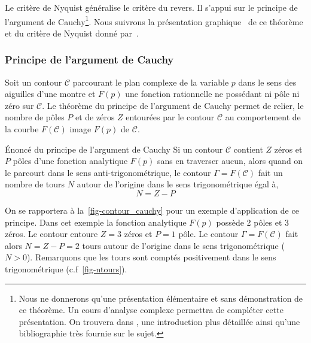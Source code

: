 Le critère de Nyquist généralise le critère du revers.
Il s'appui sur le principe de l'argument de Cauchy\footnote{Nous ne donnerons qu'une 
présentation élémentaire et sans démonstration
de ce théorème. Un cours d'analyse complexe permettra de compléter cette présentation. On 
trouvera dans \cite{laas_pc7bis,reg}, 
une introduction plus détaillée ainsi qu'une bibliographie très fournie sur le sujet.}.
Nous suivrons la présentation \og graphique\fg~ de ce théorème et du critère de Nyquist donné par~\cite{reg}. 

\subsubsection{Principe de l'argument de Cauchy}

Soit un contour $\mathcal{C}$ parcourant le plan complexe de 
la variable $p$ dans le sens des aiguilles d'une montre et $F(p)$ une fonction rationnelle 
ne possédant ni pôle ni zéro sur $\mathcal{C}$. Le théorème du principe de 
l'argument de Cauchy permet de relier, le nombre de pôles $P$ et de zéros $Z$ entourées par le contour $\mathcal{C}$ 
au comportement de la courbe $F(\mathcal{C})$ image $F(p)$ de $\mathcal{C}$.

\begin{theorem}{\'Enoncé du principe de l'argument de Cauchy} 
    Si un contour $\mathcal{C}$ contient $Z$ zéros et $P$ pôles d'une fonction analytique $F(p)$ 
    sans en traverser aucun, alors quand on le parcourt dans le sens anti-trigonométrique, le contour $\Gamma=F(\mathcal{C})$ 
    fait un nombre de tours $N$ autour de l'origine dans le sens trigonométrique égal à,
    $$
    N=Z-P
    $$
\end{theorem}

On se rapportera à la~\cref{fig-contour_cauchy} pour un exemple d'application de ce principe.
Dans cet exemple la fonction analytique $F(p)$ possède 2 pôles 
et 3 zéros. Le contour entoure $Z=3$ zéros et $P=1$ pôle.
Le contour $\Gamma=F(\mathcal{C})$ fait alors $N=Z-P=2$ tours autour 
de l'origine dans le sens trigonométrique ($N>0$). Remarquons que les tours sont 
comptés positivement dans le sens trigonométrique (c.f~\cref{fig-ntours}).

